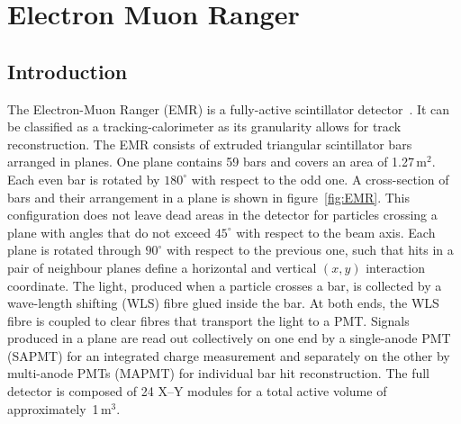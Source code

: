 \graphicspath{{05-EMR/Figures/}}

\section{Electron Muon Ranger}
\label{Sect:EMR}

\subsection{Introduction}
\label{SubSect:EMR_Intro}

The Electron-Muon Ranger (EMR) is a fully-active scintillator detector~\cite{2016JInst..11T10007}. It can be classified as a tracking-calorimeter as its granularity allows for track reconstruction. The EMR consists of extruded triangular scintillator bars arranged in planes. One plane contains 59 bars and covers an area of 1.27\,m$^2$. Each even bar is rotated by $180^{\circ}$ with respect to the odd one. A cross-section of bars and their arrangement in a plane is shown in figure~\ref{fig:EMR}. This configuration does not leave dead areas in the detector for particles crossing a plane with angles that do not exceed $45^{\circ}$ with respect to the beam axis. Each plane is rotated through $90^{\circ}$ with respect to the previous one, such that hits in a pair of neighbour planes define a horizontal and vertical $(x, y)$ interaction coordinate. The light, produced when a particle crosses a bar, is collected by a wave-length shifting (WLS) fibre glued inside the bar. At both ends, the WLS fibre is coupled to clear fibres that transport the light to a PMT. Signals produced in a plane are read out collectively on one end by a single-anode PMT (SAPMT) for an integrated charge measurement and separately on the other by multi-anode PMTs (MAPMT) for individual bar hit reconstruction. The full detector is composed of 24 X--Y modules for a total active volume of approximately~1\,m$^3$.

